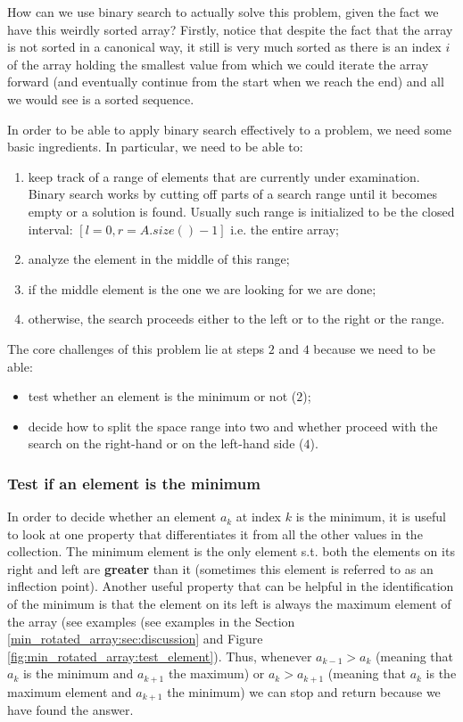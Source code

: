 How can we use binary search to actually solve this problem, given the fact we have this weirdly sorted array? 
Firstly, notice that despite the fact that the array is not sorted in a canonical way, it still is very much sorted as there is an index $i$ of the array holding the smallest value from which we could iterate the array forward (and eventually continue from the start when we reach the end) and all we would see is a sorted sequence.

In order to be able to apply binary search effectively to a problem, we need some basic ingredients. In particular, we need to be able to:
\begin{enumerate}
	\item keep track of a range of elements that are currently under examination. Binary search works by cutting off parts of a search range until it becomes empty or a solution is found.  Usually such range is initialized to be the closed interval: $[l=0, r=A.size()-1]$ i.e. the entire array;
	\item analyze the element in the middle of this range;
	\item if the middle element is the one we are looking for we are done;
	\item otherwise, the search proceeds either to the left or to the right or the range. 
\end{enumerate}

The core challenges of this problem lie at steps $2$ and $4$ because we need to be able:
\begin{itemize}
	\item  test whether an element is the minimum or not ($2$);
	\item decide how to split the space range into two and whether proceed with the search on the right-hand or on the left-hand side ($4$).
\end{itemize}

\subsubsection{Test if an element is the minimum}

In order to decide whether an element $a_k$ at index $k$ is the minimum, it is useful to look at one property that differentiates it from all the other values in the collection.
The minimum element is the only element s.t. both the elements on its right and left are \textbf{greater} than it (sometimes this element is referred to as an inflection point). 
Another useful property that can be helpful in the identification of the minimum is that the element on its left is always the maximum element of the array (see examples (see examples in the Section \ref{min_rotated_array:sec:discussion} and Figure \ref{fig:min_rotated_array:test_element}).
Thus, whenever $a_{k-1} > a_{k}$ (meaning that $a_k$ is the minimum and $a_{k+1}$ the maximum) or $a_{k} > a_{k+1}$ (meaning that $a_k$ is the maximum element and $a_{k+1}$ the minimum) we can stop and return because we have found the answer.

